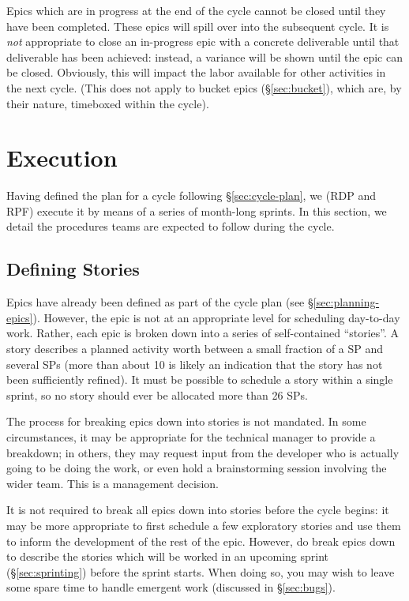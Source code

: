 Epics which are in progress at the end of the \gls{cycle} cannot be closed until they have been completed.
These \glspl{epic} will spill over into the subsequent \gls{cycle}.
It is \emph{not} appropriate to close an in-progress \gls{epic} with a concrete deliverable until that deliverable has been achieved: instead, a variance will be shown until the \gls{epic} can be closed.
Obviously, this will impact the labor available for other activities in the next \gls{cycle}.
(This does not apply to bucket \glspl{epic} (\S\ref{sec:bucket}), which are, by their nature, \gls{timebox}ed within the \gls{cycle}).


\section{Execution}
\label{sec:execution}

Having defined the plan for a \gls{cycle} following \S\ref{sec:cycle-plan}, we (RDP and RPF) execute it by means of a series of month-long sprints.
In this section, we detail the procedures teams are expected to follow during the \gls{cycle}.

\subsection{Defining Stories}
\label{sec:defining-stories}

Epics have already been defined as part of the \gls{cycle} plan (see \S\ref{sec:planning-epics}).
However, the \gls{epic} is not at an appropriate level for scheduling day-to-day work.
Rather, each \gls{epic} is broken down into a series of self-contained ``stories''.
A \gls{story} describes a planned activity worth between a small fraction of a SP and several \glspl{SP} (more than about 10 is likely an indication that the \gls{story} has not been sufficiently refined).
It must be possible to schedule a \gls{story} within a single sprint, so no \gls{story} should ever be allocated more than 26 \glspl{SP}.

The process for breaking \glspl{epic} down into stories is not mandated. In
some circumstances, it may be appropriate for the technical manager to
provide a breakdown; in others, they may request input from the
developer who is actually going to be doing the work, or even hold a
brainstorming session involving the wider team. This is a management
decision.

It is not required to break all \glspl{epic} down into stories before the \gls{cycle} begins: it may be more appropriate to first schedule a few exploratory stories and use them to inform the development of the rest of the \gls{epic}.
However, do break \glspl{epic} down to describe the stories which will be worked in an upcoming sprint (\S\ref{sec:sprinting}) before the sprint starts.
When doing so, you may wish to leave some spare time to handle emergent work (discussed in \S\ref{sec:bugs}).

